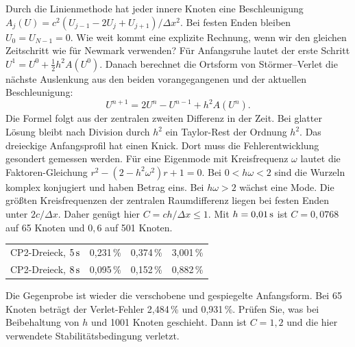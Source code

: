 Durch die Linienmethode hat jeder innere Knoten eine Beschleunigung \(A_j(U)=c^2(U_{j-1}-2U_j+U_{j+1})/\Delta x^2\). Bei festen Enden bleiben \(U_0=U_{N-1}=0\). Wie weit kommt eine explizite Rechnung, wenn wir den gleichen Zeitschritt wie für Newmark verwenden?
Für Anfangsruhe lautet der erste Schritt \(U^1=U^0+\tfrac12 h^2 A(U^0)\). Danach berechnet die Ortsform von Störmer--Verlet die nächste Auslenkung aus den beiden vorangegangenen und der aktuellen Beschleunigung:
\[
 U^{n+1}=2U^n-U^{n-1}+h^2 A(U^n).
\]
Die Formel folgt aus der zentralen zweiten Differenz in der Zeit. Bei glatter Lösung bleibt nach Division durch \(h^2\) ein Taylor-Rest der Ordnung \(h^2\). Das dreieckige Anfangsprofil hat einen Knick. Dort muss die Fehlerentwicklung gesondert gemessen werden.
Für eine Eigenmode mit Kreisfrequenz \(\omega\) lautet die Faktoren-Gleichung \(r^2-(2-h^2\omega^2)r+1=0\). Bei \(0<h\omega<2\) sind die Wurzeln komplex konjugiert und haben Betrag eins. Bei \(h\omega>2\) wächst eine Mode. Die größten Kreisfrequenzen der zentralen Raumdifferenz liegen bei festen Enden unter \(2c/\Delta x\). Daher genügt hier \(C=ch/\Delta x\le1\). Mit \(h=0{,}01\,\mathrm{s}\) ist \(C=0{,}0768\) auf 65 Knoten und \(0{,}6\) auf 501 Knoten.
{\tblstart\begin{tabularx}{\linewidth}{@{}Yrrr@{}}\toprule
{}&&&\\\midrule
CP2-Dreieck, \(5\,\mathrm{s}\)&0,231\,\%&0,374\,\%&3,001\,\%\\
CP2-Dreieck, \(8\,\mathrm{s}\)&0,095\,\%&0,152\,\%&0,882\,\%\\\bottomrule
\end{tabularx}\par}
Die Gegenprobe ist wieder die verschobene und gespiegelte Anfangsform. Bei 65 Knoten beträgt der Verlet-Fehler 2,484\,\% und 0,931\,\%. Prüfen Sie, was bei Beibehaltung von \(h\) und 1001 Knoten geschieht. Dann ist \(C=1{,}2\) und die hier verwendete Stabilitätsbedingung verletzt.

